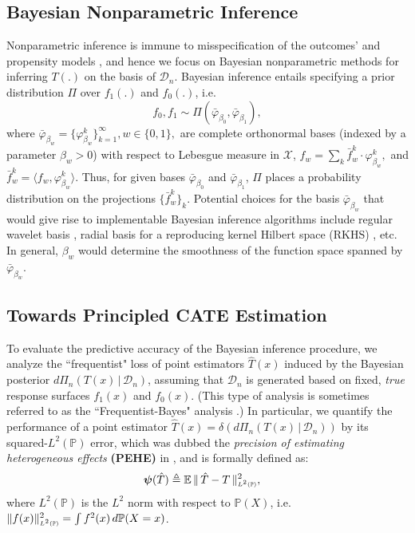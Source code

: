 \documentclass [PhD] {uclathes}
\begin{document}
\subsection{Bayesian Nonparametric Inference}
Nonparametric inference is immune to misspecification of the outcomes' and propensity models \cite{kennedy2018nonparametric}, and hence we focus on Bayesian nonparametric methods for inferring $T(.)$ on the basis of $\mathcal{D}_n$. Bayesian inference entails specifying a prior distribution $\Pi$ over $f_1(.)$ and $f_0(.)$, i.e.
\begin{equation}
f_0, f_1 \sim \Pi(\bar{\varphi}_{\beta_0}, \bar{\varphi}_{\beta_1}),
\label{ch2eq4}
\end{equation}
where $\bar{\varphi}_{\beta_w} = \{\varphi^k_{\beta_w}\}_{k=1}^\infty, w \in \{0,1\},$ are complete orthonormal bases (indexed by a parameter $\beta_w > 0$) with respect to Lebesgue measure in $\mathcal{X}$, $f_w = \sum_k \bar{f}^k_w \cdot \varphi^k_{\beta_w},$ and $\bar{f}^k_w = \langle f_w, \varphi^k_{\beta_w}\rangle$. Thus, for given bases $\bar{\varphi}_{\beta_0}$ and $\bar{\varphi}_{\beta_1}$, $\Pi$ places a probability distribution on the projections $\{\bar{f}^k_w\}_k$. Potential choices for the basis $\bar{\varphi}_{\beta_w}$ that would give rise to implementable Bayesian inference algorithms include regular wavelet basis \cite{zhang1997using}, radial basis for a reproducing kernel Hilbert space (RKHS) \cite{van2008reproducing}, etc. In general, $\beta_w$ would determine the smoothness of the function space spanned by $\bar{\varphi}_{\beta_w}$. 

\subsection{Towards Principled CATE Estimation} 
To evaluate the predictive accuracy of the Bayesian inference procedure, we analyze the ``frequentist" loss of point estimators $\hat{T}(x)$ induced by the Bayesian posterior $d\Pi_n(T(x)\,|\,\mathcal{D}_n)$, assuming that $\mathcal{D}_n$ is generated based on fixed, \textit{true} response surfaces $f_{1}(x)$ and $f_{0}(x)$. (This type of analysis is sometimes referred to as the ``Frequentist-Bayes" analysis \cite{sniekers2015adaptive}.) In particular, we quantify the performance of a point estimator $\hat{T}(x) = \delta(d\Pi_n(T(x)\,|\,\mathcal{D}_n))$ by its squared-$L^2(\mathbb{P})$ error, which was dubbed the \textit{precision of estimating heterogeneous effects} \textbf{(PEHE)} in \cite{hill2011bayesian}, and is formally defined as:
\begin{align}
\mathbold{\psi}(\hat{T}) &\triangleq \mathbb{E}\,\|\,\hat{T} - T\,\|^2_{\mbox{\tiny $L^2(\mathbb{P})$}}, 
\label{ch2eq5}
\end{align} 
where $L^2(\mathbb{P})$ is the $L^2$ norm with respect to $\mathbb{P}(X)$, i.e. $\|f(x)\|^2_{\mbox{\tiny $L^2(\mathbb{P})$}} = \int f^2(x)\, d\mathbb{P}(X=x)$.
\end{document}
